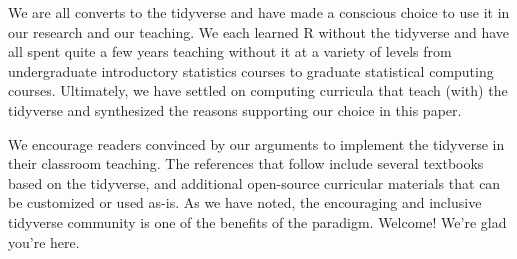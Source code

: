 \documentclass[12pt]{article}
\begin{document}
We are all converts to the tidyverse and have made a conscious choice to
use it in our research and our teaching. We each learned R without the
tidyverse and have all spent quite a few years teaching without it at a
variety of levels from undergraduate introductory statistics courses to
graduate statistical computing courses. Ultimately, we have settled on
computing curricula that teach (with) the tidyverse and synthesized the
reasons supporting our choice in this paper.

We encourage readers convinced by our arguments to implement the
tidyverse in their classroom teaching. The references that follow
include several textbooks based on the tidyverse, and additional
open-source curricular materials that can be customized or used as-is.
As we have noted, the encouraging and inclusive tidyverse community is
one of the benefits of the paradigm. Welcome! We're glad you're here.

\pagebreak



\end{document}
